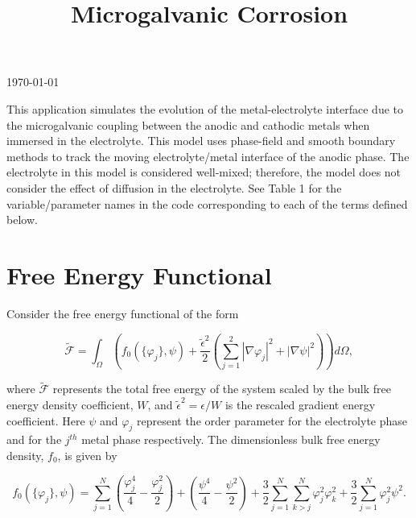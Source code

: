 \documentclass[11pt]{article}
\title{\huge Microgalvanic Corrosion}
\makeatletter
\renewcommand{\maketitle} %
{ \begingroup \vskip 10pt \begin{center} \large {\bf \@title}
	\vskip 10pt \end{center}
  \vskip 10pt \endgroup \setcounter{footnote}{0} }
\makeatother
\begin{document}
\maketitle
\centerline{\today}
\vspace{.25in}


This application simulates the evolution of the metal-electrolyte interface due to the microgalvanic coupling between the anodic and cathodic metals when immersed in the electrolyte. This model uses phase-field and smooth boundary methods to track the moving electrolyte/metal interface of the anodic phase. The electrolyte in this model is considered well-mixed; therefore, the model does not consider the effect of diffusion in the electrolyte. See Table 1 for the variable/parameter names in the code corresponding to each of the terms defined below.

\bigskip
\section{Free Energy Functional}

Consider the free energy functional of the form

\begin{equation} \label{free_energy}
 \widetilde {\mathcal F} = \int_\Omega \left(f_0\left(\{\varphi_j\},\psi\right)+\frac{\widetilde\epsilon^2}{2}\left(\sum^2_{j=1}|\nabla\varphi_j|^2+|\nabla\psi|^2\right)\right)d\Omega,
\end{equation}

where $\widetilde {\mathcal F}$ represents the total free energy of the system scaled by the bulk free energy density coefficient, $W$, and $\tilde{\epsilon}^2=\epsilon/W$ is the rescaled gradient energy coefficient. Here  $\psi$ and $\varphi_j$  represent the order parameter for the electrolyte phase and for the $j^{th}$ metal phase respectively. The dimensionless bulk free energy density, $f_0$, is given by

\begin{equation} \label{f0}
f_0\left(\{\varphi_j\},\psi\right)= \sum^N_{j=1}\left(\frac{\varphi_j^4}{4}-\frac{\varphi_j^2}{2}\right)+\left(\frac{\psi^4}{4}-\frac{\psi^2}{2}\right)+\frac{3}{2}\sum^N_{j=1}\sum^N_{k>j}\varphi_j^2\varphi_k^2+\frac{3}{2}\sum^N_{j=1} \varphi_j^2\psi^2.
\end{equation}
\end{document}

